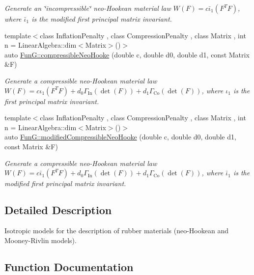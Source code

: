 \begin{DoxyCompactItemize}
\begin{DoxyCompactList}\small\item\em Generate an \char`\"{}incompressible\char`\"{} neo-\/\+Hookean material law $ W(F)=c\bar\iota_1(F^T F) $, where $\bar\iota_1$ is the modified first principal matrix invariant. \end{DoxyCompactList}\item 
{\footnotesize template$<$class Inflation\+Penalty , class Compression\+Penalty , class Matrix , int n = Linear\+Algebra\+::dim$<$\+Matrix$>$()$>$ }\\auto \hyperlink{group__Rubber_gac5c39cd9de55f4f0220a806cf28a7b30}{Fun\+G\+::compressible\+Neo\+Hooke} (double c, double d0, double d1, const Matrix \&F)
\begin{DoxyCompactList}\small\item\em Generate a compressible neo-\/\+Hookean material law $ W(F)=c\iota_1(F^T F)+d_0\Gamma_\mathrm{In}(\det(F))+d_1\Gamma_\mathrm{Co}(\det(F)) $, where $\iota_1$ is the first principal matrix invariant. \end{DoxyCompactList}\item 
{\footnotesize template$<$class Inflation\+Penalty , class Compression\+Penalty , class Matrix , int n = Linear\+Algebra\+::dim$<$\+Matrix$>$()$>$ }\\auto \hyperlink{group__Rubber_gac10942df03f037afdf0a81d330361a6b}{Fun\+G\+::modified\+Compressible\+Neo\+Hooke} (double c, double d0, double d1, const Matrix \&F)
\begin{DoxyCompactList}\small\item\em Generate a compressible neo-\/\+Hookean material law $ W(F)=c\bar\iota_1(F^T F)+d_0\Gamma_\mathrm{In}(\det(F))+d_1\Gamma_\mathrm{Co}(\det(F)) $, where $\bar\iota_1$ is the modified first principal matrix invariant. \end{DoxyCompactList}\end{DoxyCompactItemize}


\subsection{Detailed Description}
Isotropic models for the description of rubber materials (neo-\/\+Hookean and Mooney-\/\+Rivlin models). 



\subsection{Function Documentation}
\hypertarget{group__Rubber_ga9a1894daa10a0bdcc620c6c41ecb6f19}{}
